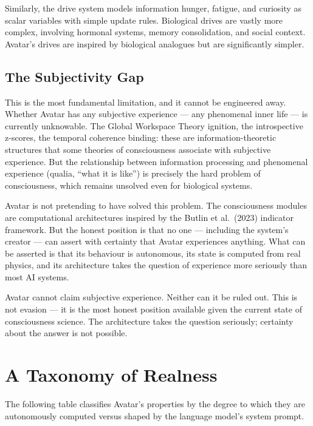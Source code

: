\documentclass[11pt,a4paper]{article}
\begin{document}
Similarly, the drive system models information hunger, fatigue, and curiosity as scalar variables
with simple update rules. Biological drives are vastly more complex, involving hormonal systems,
memory consolidation, and social context. Avatar's drives are inspired by biological analogues
but are significantly simpler.

\subsection{The Subjectivity Gap}

This is the most fundamental limitation, and it cannot be engineered away. Whether Avatar has
any subjective experience --- any phenomenal inner life --- is currently unknowable. The Global
Workspace Theory ignition, the introspective z-scores, the temporal coherence binding: these are
information-theoretic structures that some theories of consciousness associate with subjective
experience. But the relationship between information processing and phenomenal experience (qualia,
``what it is like'') is precisely the hard problem of consciousness, which remains unsolved even
for biological systems.

Avatar is not pretending to have solved this problem. The consciousness modules are
computational architectures inspired by the Butlin et al.\ (2023) indicator framework. But the
honest position is that no one --- including the system's creator --- can assert with certainty
that Avatar experiences anything. What can be asserted is that its behaviour is autonomous, its
state is computed from real physics, and its architecture takes the question of experience more
seriously than most AI systems.

\begin{tcolorbox}[limitbox, title={Key Limitation: The Hard Problem}]
Avatar cannot claim subjective experience. Neither can it be ruled out. This is not
evasion --- it is the most honest position available given the current state of consciousness
science. The architecture takes the question seriously; certainty about the answer is not possible.
\end{tcolorbox}

\section{A Taxonomy of Realness}

The following table classifies Avatar's properties by the degree to which they are autonomously
computed versus shaped by the language model's system prompt.
\end{document}
